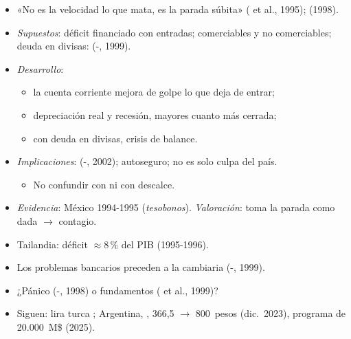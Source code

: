 \documentclass{article}
\begin{document}
\begin{columnas}
\begin{itemize}
\item «No es la velocidad lo que mata, es la parada súbita» ( et al., 1995);  (1998).
\item \emph{Supuestos}: déficit financiado con entradas; comerciables y no comerciables; deuda en divisas:  (-, 1999).
\item \emph{Desarrollo}:
  \begin{itemize}
  \item la cuenta corriente mejora de golpe lo que deja de entrar;
  \item depreciación real y recesión, mayores cuanto más cerrada;
  \item con deuda en divisas, crisis de balance.
  \end{itemize}
\item \emph{Implicaciones}:  (-, 2002); autoseguro; no es solo culpa del país.
  \begin{itemize}
  \item No confundir con  ni con descalce.
  \end{itemize}
\item \emph{Evidencia}: México 1994-1995 (\emph{tesobonos}). \emph{Valoración}: toma la parada como dada $\to$ contagio.
\end{itemize}

\begin{itemize}
\item Tailandia: déficit $\approx$8\,\% del PIB (1995-1996).
\item Los problemas bancarios preceden a la cambiaria (-, 1999).
\item ¿Pánico (-, 1998) o fundamentos ( et al., 1999)?
\item Siguen: lira turca ; Argentina, , 366,5 $\to$ 800~pesos (dic.\ 2023), programa de 20.000~M\$ (2025).
\end{itemize}


\end{columnas}
\end{document}
